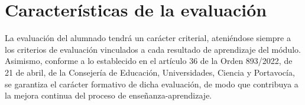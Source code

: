 

\section{Características de la evaluación}

La evaluación del alumnado tendrá un carácter criterial, ateniéndose siempre a los criterios de evaluación vinculados a cada resultado de aprendizaje del módulo. Asimismo, conforme a lo establecido en el artículo 36 de la Orden 893/2022, de 21 de abril, de la Consejería de Educación, Universidades, Ciencia y Portavocía, se garantiza el carácter formativo de dicha evaluación, de modo que contribuya a la mejora continua del proceso de enseñanza-aprendizaje.


